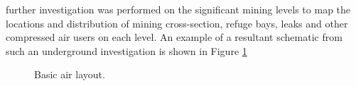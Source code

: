 	\A further investigation was performed on the significant mining levels to map the locations and distribution of mining cross-section, refuge bays, leaks and other compressed air users on each level. An example of a resultant schematic from such an underground investigation is shown in Figure \ref{fig: KUS Underground level layout}
	
	\begin{figure}[h!]
		\centering
		\caption{Basic air layout.}
		\label{fig: KUS Underground level layout}
	\end{figure}	

